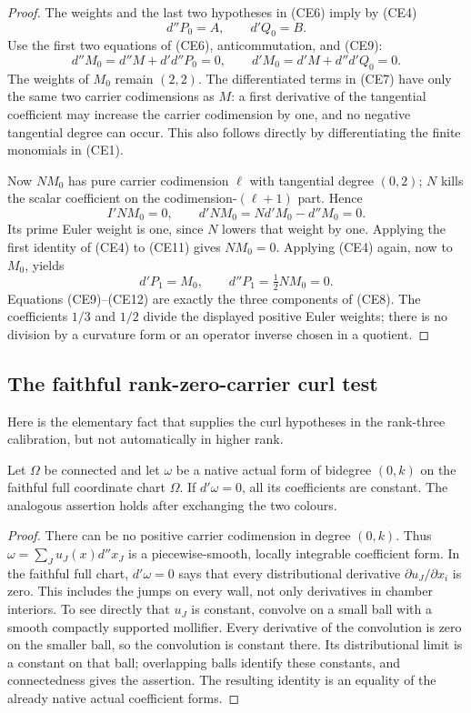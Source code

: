 \begin{proof}
The weights and the last two hypotheses in (CE6) imply by (CE4)
\[
                         d''P_0=A,\qquad d'Q_0=B.
 \tag{CE9}
\]
Use the first two equations of (CE6), anticommutation, and (CE9):
\[
 d''M_0=d''M+d'd''P_0=0,\qquad
 d'M_0=d'M+d''d'Q_0=0.
 \tag{CE10}
\]
The weights of $M_0$ remain $(2,2)$.  The differentiated terms in
(CE7) have only the same two carrier codimensions as $M$: a first
derivative of the tangential coefficient may increase the carrier
codimension by one, and no negative tangential degree can occur.
This also follows directly by differentiating the finite monomials
in (CE1).

Now $NM_0$ has pure carrier codimension $\ell$ with tangential
degree $(0,2)$; $N$ kills the scalar coefficient on the
codimension-$(\ell+1)$ part.  Hence
\[
 I'NM_0=0,
 \qquad d'NM_0=Nd'M_0-d''M_0=0.
 \tag{CE11}
\]
Its prime Euler weight is one, since $N$ lowers that weight by
one.  Applying the first identity of (CE4) to (CE11) gives
$NM_0=0$.  Applying (CE4) again, now to $M_0$, yields
\[
                d'P_1=M_0,\qquad d''P_1=\tfrac12NM_0=0.
 \tag{CE12}
\]
Equations (CE9)--(CE12) are exactly the three components of (CE8).
The coefficients $1/3$ and $1/2$ divide the displayed positive
Euler weights; there is no division by a curvature form or an
operator inverse chosen in a quotient.
\end{proof}

\subsection{The faithful rank-zero-carrier curl test}

Here is the elementary fact that supplies the curl hypotheses in
the rank-three calibration, but not automatically in higher rank.

\begin{lemma}
Let $\Omega$ be connected and let $\omega$ be a native actual form
of bidegree $(0,k)$ on the faithful full coordinate chart $\Omega$.
If $d'\omega=0$, all its coefficients are constant.  The analogous
assertion holds after exchanging the two colours.
\end{lemma}

\begin{proof}
There can be no positive carrier codimension in degree $(0,k)$.
Thus $\omega=\sum_J u_J(x)d''x_J$ is a piecewise-smooth,
locally integrable coefficient form.  In the faithful full chart,
$d'\omega=0$ says that every distributional derivative
$\partial u_J/\partial x_i$ is zero.  This includes the jumps on
every wall, not only derivatives in chamber interiors.  To see
directly that $u_J$ is constant, convolve on a small ball with a
smooth compactly supported mollifier.  Every derivative of the
convolution is zero on the smaller ball, so the convolution is
constant there.  Its distributional limit is a constant on that
ball; overlapping balls identify these constants, and connectedness
gives the assertion.  The resulting identity is an equality of the
already native actual coefficient forms.
\end{proof}

